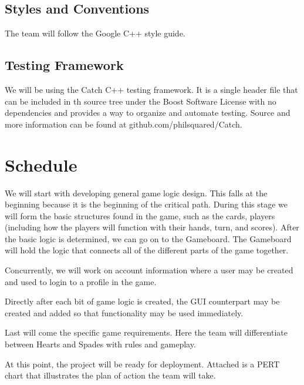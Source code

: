 \documentclass[11pt, titlepage]{article}
\begin{document}
    \subsection{Styles and Conventions}
    	The team will follow the Google C++ style guide.

    \subsection{Testing Framework}
    	We will be using the Catch C++ testing framework.  It is a single header file that can be included in th source tree under the Boost Software License with no dependencies and provides a way to organize and automate testing.  Source and more information can be found at github.com/philsquared/Catch.

    \section{Schedule}

	We will start with developing general game logic design.  This falls at the beginning because it is the beginning of the critical path.  During this stage we will form the basic structures found in the game, such as the cards, players (including how the players will function with their hands, turn, and scores).
	After the basic logic is determined, we can go on to the Gameboard.  The Gameboard will 	hold the logic that connects all of the different parts of the game together.

Concurrently, we will work on account information where a user may be created and used to login to a profile in the game.

Directly after each bit of game logic is created, the GUI counterpart may be created and added so that functionality may be used immediately.

Last will come the specific game requirements.  Here the team will differentiate between Hearts and Spades with rules and gameplay.

At this point, the project will be ready for deployment.  Attached is a PERT chart that illustrates the plan of action the team will take.


\end{document}
